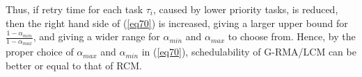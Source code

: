\documentclass[conference]{IEEEtran}
\newtheorem{clm}{Claim}
\begin{document}
Thus, if retry time for each task $\tau_{i}$, caused by lower priority tasks, is reduced, then the right
hand side of (\ref{eq70}) is increased, giving a larger
upper bound for $\frac{1-\alpha_{min}}{1-\alpha_{max}}$, and giving
a wider range for $\alpha_{min}$ and $\alpha_{max}$ to choose from.
Hence, by the proper choice of $\alpha_{max}$ and $\alpha_{min}$ in  (\ref{eq70}), 
schedulability of G-RMA/LCM can be better or equal to that of RCM.

\end{document}
